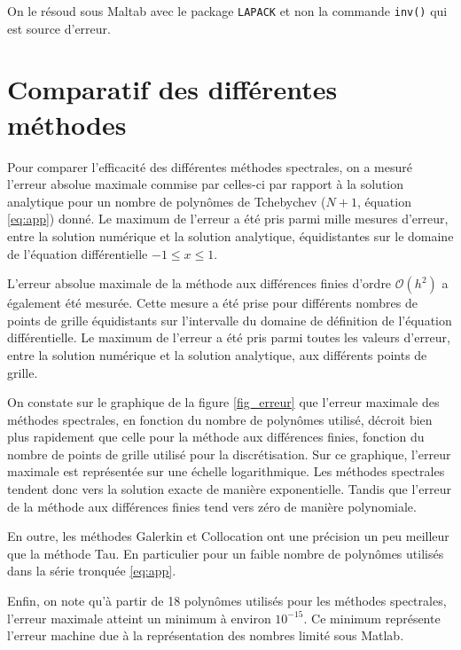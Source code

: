 \documentclass{report}
\begin{document}
On le résoud sous Maltab avec le package \texttt{LAPACK} et non la commande \texttt{inv()} qui est source d'erreur.

\section{Comparatif des différentes méthodes}

Pour comparer l'efficacité des différentes méthodes spectrales, on a mesuré l'erreur absolue maximale commise par celles-ci par rapport à la solution analytique pour un nombre de polynômes de Tchebychev ($N+1$, équation \eqref{eq:app}) donné. Le maximum de l'erreur a été pris parmi mille mesures d'erreur, entre la solution numérique et la solution analytique, équidistantes sur le domaine de l'équation différentielle $-1\leq x \leq 1$.

L'erreur absolue maximale de la méthode aux différences finies d'ordre $\mathcal{O}(h^2)$ a également été mesurée. Cette mesure a été prise pour différents nombres de points de grille équidistants sur l'intervalle du domaine de définition de l'équation différentielle. Le maximum de l'erreur a été pris parmi toutes les valeurs d'erreur, entre la solution numérique et la solution analytique, aux  différents points de grille.

On constate sur le graphique de la figure \ref{fig_erreur} que l'erreur maximale des méthodes spectrales, en fonction du nombre de polynômes utilisé, décroit bien plus rapidement que celle pour la méthode aux différences finies, fonction du nombre de points de grille utilisé pour la discrétisation. Sur ce graphique, l'erreur maximale est représentée sur une échelle logarithmique. Les méthodes spectrales tendent donc vers la solution exacte de manière exponentielle. Tandis que l'erreur de la méthode aux différences finies tend vers zéro de manière polynomiale.

En outre, les méthodes Galerkin et Collocation ont une précision un peu meilleur que la méthode Tau. En particulier pour un faible nombre de polynômes utilisés dans la série tronquée \eqref{eq:app}.

Enfin, on note qu'à partir de 18 polynômes utilisés pour les méthodes spectrales, l'erreur maximale atteint un minimum à environ $10^{-15}$. Ce minimum représente l'erreur machine due à la représentation des nombres limité sous Matlab.
\end{document}
